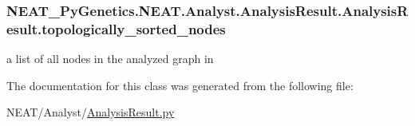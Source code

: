 \subsubsection[{\texorpdfstring{topologically\+\_\+sorted\+\_\+nodes}{topologically_sorted_nodes}}]{\setlength{\rightskip}{0pt plus 5cm}N\+E\+A\+T\+\_\+\+Py\+Genetics.\+N\+E\+A\+T.\+Analyst.\+Analysis\+Result.\+Analysis\+Result.\+topologically\+\_\+sorted\+\_\+nodes}\hypertarget{classNEAT__PyGenetics_1_1NEAT_1_1Analyst_1_1AnalysisResult_1_1AnalysisResult_a5dec17c624dfc418d21b543b366413e2}{}\label{classNEAT__PyGenetics_1_1NEAT_1_1Analyst_1_1AnalysisResult_1_1AnalysisResult_a5dec17c624dfc418d21b543b366413e2}


a list of all nodes in the analyzed graph in 



The documentation for this class was generated from the following file\+:\begin{DoxyCompactItemize}
\item 
N\+E\+A\+T/\+Analyst/\hyperlink{AnalysisResult_8py}{Analysis\+Result.\+py}\end{DoxyCompactItemize}
